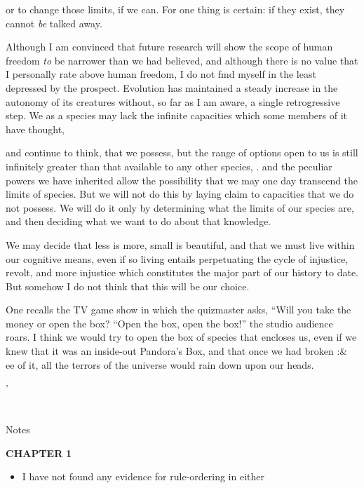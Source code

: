 or to change those limits, if we can. For one thing is certain: if they exist, they cannot \textit{be} talked away.

Although I am convinced that future research will show the scope of human freedom \textit{to} be narrower than we had believed, and although there is no value that I personally rate above human freedom, I do not fmd myself in the least depressed by the prospect. Evolution has maintained a steady increase in the autonomy of its creatures with\-out, so far as I am aware, a single retrogressive step. We as a species may lack the infinite capacities which some members of it have thought,


and continue to think, that we possess, but the range of options open to us is still infinitely greater than that available to any other species, . and the peculiar powers we have inherited allow the possibility that we may one day transcend the limits of species. But we will not do this by laying claim to capacities that we do not possess. We will do it only by determining what the limits of our species are, and then decid\-ing what we want to do about that knowledge.

We may decide that less is more, small is beautiful, and that we must live within our cognitive means, even if so living entails perpetu\-ating the cycle of injustice, revolt, and more injustice which constitutes the major part of our history to date. But somehow I do not think that this will be our choice.

One recalls the TV game show in which the quizmaster asks, ``Will you take the money or open the box?{\textquotedbl} ``Open the box, open the box!'' the studio audience roars. I think we would try to open the box of species that encloses us, even if we knew that it was an inside-out Pandora's Box, and that once we had broken :\& ee of it, all the terrors of the universe would rain down upon our heads.

'

\section{}
Notes

\textbf{CHAPTER} \textbf{1}

\begin{itemize}
\item I have not found any evidence for rule-ordering in either
\end{itemize}

